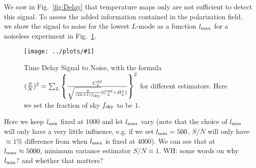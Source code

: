 \documentclass[prl,amsmath,amssymb,floatfix,superscriptaddress,nofootinbib,twocolumn]{revtex4-1}
\newcommand{\sfig}[2]{
\texttt{[image: ../plots/\#1]}
        }
\newcommand{\Spng}[2]{
   \begin{figure}[thbp]
   \begin{center}
    \sfig{#1.png}{\columnwidth}
    \caption{{\small #2}}
    \label{fig:#1}
     \end{center}
   \end{figure}
}
\newcommand{\rf}[1]{\ref{fig:#1}}
\newcommand{\wh}[1]{{\color{red} WH: #1}}
\begin{document}
We saw in Fig.~\rf{Delay} that temperature maps only are not sufficient to detect this signal. To assess the added information contained in the polarization field, we show the signal to noise for the lowest $L$-mode as a function $l_{\rm max}$ for a noiseless experiment in Fig.~\rf{StoN}.
\Spng{StoN}{Time Delay Signal to Noise, with the formula $(\frac{S}{N})^{2}=\sum_{L}\left\{ \frac{C^{dd}_{L}}{\sqrt{\frac{2}{(2L+1)f_{\rm sky}}}(C^{dd}_{L}+B^{\alpha}_{L})}\right\}^{2}$ for different estimators. Here we set the fraction of sky $f_{\rm sky}$ to be $1$.}
Here we keep $l_{\rm min}$ fixed at $1000$ and let $l_{\rm max}$ vary (note that the choice of $l_{\rm min}$ will only have a very little influence, e.g. if we set $l_{\rm min}=500$, $S/N$ will only have $\approx 1\%$ difference from when $l_{\rm max}$ is fixed at $4000$). We can see that at $l_{\rm max} \approx 5000$, minimum variance estimator $S/N \approx 1$.  \wh{some words on why $l_{\rm min}$? and whether that matters?}

\appendix
\end{document}
